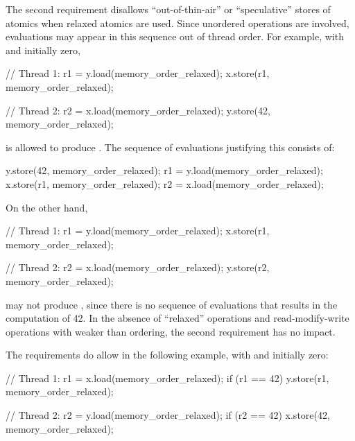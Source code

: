\pnum
\enternote The second requirement disallows ``out-of-thin-air'' or ``speculative'' stores of atomics when relaxed atomics are used. Since unordered operations are involved, evaluations may appear in this sequence out of thread order. For example, with  and  initially zero,

\begin{codeblock}
// Thread 1:
r1 = y.load(memory_order_relaxed);
x.store(r1, memory_order_relaxed);
\end{codeblock}

\begin{codeblock}
// Thread 2:
r2 = x.load(memory_order_relaxed);
y.store(42, memory_order_relaxed);
\end{codeblock}

is allowed to produce . The sequence of evaluations justifying this consists of:

\begin{codeblock}
y.store(42, memory_order_relaxed);
r1 = y.load(memory_order_relaxed);
x.store(r1, memory_order_relaxed);
r2 = x.load(memory_order_relaxed);
\end{codeblock}

On the other hand,

\begin{codeblock}
// Thread 1:
r1 = y.load(memory_order_relaxed);
x.store(r1, memory_order_relaxed);
\end{codeblock}

\begin{codeblock}
// Thread 2:
r2 = x.load(memory_order_relaxed);
y.store(r2, memory_order_relaxed);
\end{codeblock}

may not produce , since there is no sequence of evaluations that
results in the computation of 42. In the absence of ``relaxed'' operations and
read-modify-write operations with weaker than  ordering, the
second requirement has no impact.\exitnote

\pnum
\enternote The requirements do allow  in the following example,
with  and  initially zero:

\begin{codeblock}
// Thread 1:
r1 = x.load(memory_order_relaxed);
if (r1 == 42) y.store(r1, memory_order_relaxed);
\end{codeblock}

\begin{codeblock}
// Thread 2:
r2 = y.load(memory_order_relaxed);
if (r2 == 42) x.store(42, memory_order_relaxed);
\end{codeblock}

